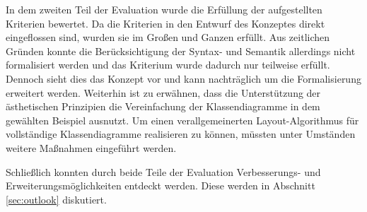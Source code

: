 In dem zweiten Teil der Evaluation wurde die Erfüllung der aufgestellten Kriterien bewertet. Da die Kriterien in den Entwurf des Konzeptes direkt eingeflossen sind, wurden sie im Großen und Ganzen erfüllt. Aus zeitlichen Gründen konnte die Berücksichtigung der Syntax- und Semantik allerdings nicht formalisiert werden und das Kriterium wurde dadurch nur teilweise erfüllt. Dennoch sieht dies das Konzept vor und kann nachträglich um die Formalisierung erweitert werden. Weiterhin ist zu erwähnen, dass die Unterstützung der ästhetischen Prinzipien die Vereinfachung der Klassendiagramme in dem gewählten Beispiel ausnutzt. Um einen verallgemeinerten Layout-Algorithmus für vollständige Klassendiagramme realisieren zu können, müssten unter Umständen weitere Maßnahmen eingeführt werden.

Schließlich konnten durch beide Teile der Evaluation Verbesserungs- und Erweiterungsmöglichkeiten entdeckt werden. Diese werden in Abschnitt \ref{sec:outlook} diskutiert.
